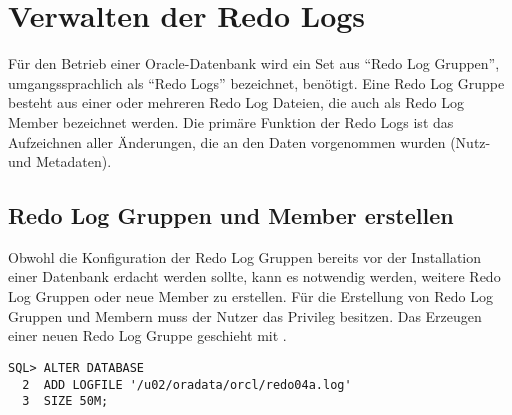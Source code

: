     \section{Verwalten der Redo Logs}
      Für den Betrieb einer Oracle-Datenbank wird ein Set aus \enquote{Redo Log Gruppen}, umgangssprachlich als \enquote{Redo Logs} bezeichnet, benötigt. Eine Redo Log Gruppe besteht aus einer oder mehreren Redo Log Dateien, die auch als Redo Log Member bezeichnet werden. Die primäre Funktion der Redo Logs ist das Aufzeichnen aller Änderungen, die an den Daten vorgenommen wurden (Nutz- und Metadaten).
      \subsection{Redo Log Gruppen und Member erstellen}
        Obwohl die Konfiguration der Redo Log Gruppen bereits vor der Installation einer Datenbank erdacht werden sollte, kann es notwendig werden, weitere Redo Log Gruppen oder neue Member zu erstellen. Für die Erstellung von Redo Log Gruppen und Membern muss der Nutzer das Privileg  besitzen.
\clearpage
        Das Erzeugen einer neuen Redo Log Gruppe geschieht mit .
          \begin{lstlisting}[caption={Erzeugen einer Redo Log Gruppe},label=admin30,language=oracle_sql]
SQL> ALTER DATABASE
  2  ADD LOGFILE '/u02/oradata/orcl/redo04a.log'
  3  SIZE 50M;
          \end{lstlisting}
  
